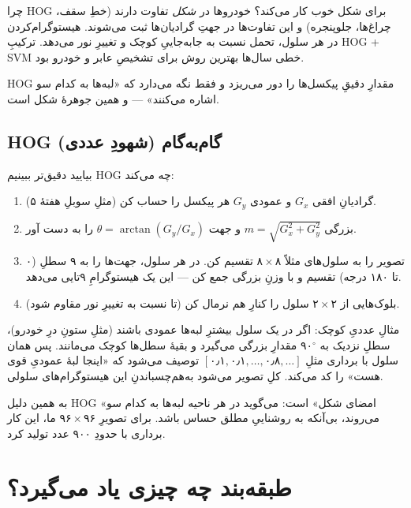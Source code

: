 \documentclass[12pt,a4paper]{article}
\begin{document}
\begin{riyazi}
چرا HOG برای شکل خوب کار می‌کند؟ خودروها در \emph{شکل} تفاوت دارند (خطِ سقف، چراغ‌ها، جلوپنجره) و این تفاوت‌ها در جهتِ گرادیان‌ها ثبت می‌شوند. هیستوگرام‌کردن در هر سلول، تحمل نسبت به جابه‌جاییِ کوچک و تغییرِ نور می‌دهد. ترکیبِ HOG + SVMِ خطی سال‌ها بهترین روش برای تشخیصِ عابر و خودرو بود.
\end{riyazi}

HOG مقدارِ دقیقِ پیکسل‌ها را دور می‌ریزد و فقط نگه می‌دارد که «لبه‌ها به کدام سو اشاره می‌کنند» — و همین جوهرهٔ شکل است.

\subsection{HOG گام‌به‌گام (شهودِ عددی)}

بیایید دقیق‌تر ببینیم HOG چه می‌کند:

\begin{enumerate}
  \item گرادیانِ افقی $G_x$ و عمودی $G_y$ هر پیکسل را حساب کن (مثلِ سوبلِ هفتهٔ ۵).
  \item بزرگی $m=\sqrt{G_x^2+G_y^2}$ و جهت $\theta=\arctan(G_y/G_x)$ را به دست آور.
  \item تصویر را به سلول‌های مثلاً $۸\times۸$ تقسیم کن. در هر سلول، جهت‌ها را به ۹ سطلِ ($۰$ تا $۱۸۰$ درجه) تقسیم و با وزنِ بزرگی جمع کن — این یک هیستوگرامِ ۹‌تایی می‌دهد.
  \item بلوک‌هایی از $۲\times۲$ سلول را کنارِ هم نرمال کن (تا نسبت به تغییرِ نور مقاوم شود).
\end{enumerate}

\begin{riyazi}
مثالِ عددیِ کوچک: اگر در یک سلول بیشترِ لبه‌ها عمودی باشند (مثلِ ستونِ درِ خودرو)، سطلِ نزدیک به $۹۰^\circ$ مقدارِ بزرگی می‌گیرد و بقیهٔ سطل‌ها کوچک می‌مانند. پس همان سلول با برداری مثلِ $[۰٫۱, ۰٫۱, \dots, ۰٫۸, \dots]$ توصیف می‌شود که «اینجا لبهٔ عمودیِ قوی هست» را کد می‌کند. کلِ تصویر می‌شود به‌هم‌چسباندنِ این هیستوگرام‌های سلولی.
\end{riyazi}

\begin{yaddasht}
به همین دلیل HOG «امضای شکل» است: می‌گوید در هر ناحیه لبه‌ها به کدام سو می‌روند، بی‌آنکه به روشناییِ مطلق حساس باشد. برای تصویرِ $۹۶\times۹۶$ ما، این کار برداری با حدودِ ۹۰۰ عدد تولید کرد.
\end{yaddasht}

\section{طبقه‌بند چه چیزی یاد می‌گیرد؟}
\end{document}
